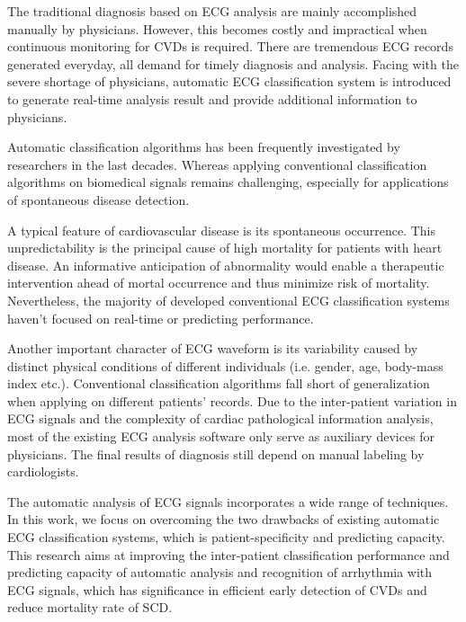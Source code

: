 The traditional diagnosis based on ECG analysis are mainly accomplished manually by physicians. %
However, this becomes costly and impractical when continuous monitoring for CVDs is required. There are tremendous ECG records generated everyday, all demand for timely diagnosis and analysis. Facing with the severe shortage of physicians, automatic ECG classification system is introduced to generate real-time analysis result and provide additional information to physicians. 

Automatic classification algorithms has been frequently investigated by researchers in the last decades. Whereas applying conventional classification algorithms on biomedical signals remains challenging, especially for applications of spontaneous disease detection. 

A typical feature of cardiovascular disease is its spontaneous occurrence. This unpredictability is the principal cause of high mortality for patients with heart disease. An informative anticipation of abnormality would enable a therapeutic intervention ahead of mortal occurrence and thus minimize risk of mortality. Nevertheless, the majority of developed conventional ECG classification systems haven't focused on real-time or predicting performance. %

Another important character of ECG waveform is its variability caused by distinct physical conditions of different individuals (i.e. gender, age, body-mass index etc.)\cite{agesex}\cite{intervaria}. Conventional classification algorithms fall short of generalization when applying on different patients' records\cite{llamedo2012automatic}. Due to the inter-patient variation in ECG signals and the complexity of cardiac pathological information analysis, most of the existing ECG analysis software only serve as auxiliary devices for physicians. The final results of diagnosis still depend on manual labeling by cardiologists. %

The automatic analysis of ECG signals incorporates a wide range of techniques. In this work, we focus on overcoming the two drawbacks of existing automatic ECG classification systems, which is patient-specificity and predicting capacity. This research aims at improving the inter-patient classification performance and predicting capacity of automatic analysis and recognition of arrhythmia with ECG signals, which has significance in efficient early detection of CVDs and reduce mortality rate of SCD. 

